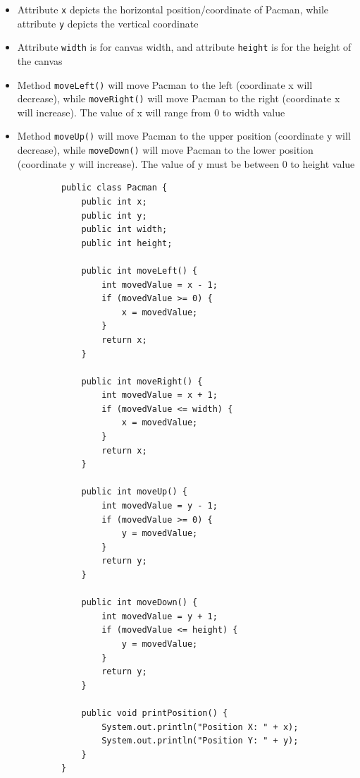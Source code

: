 \documentclass[12pt,titlepage]{article}
\begin{document}
\begin{enumerate}
{        \begin{itemize}
            \item Attribute \texttt{x} depicts the horizontal position/coordinate of Pacman, while attribute \texttt{y} depicts the vertical coordinate
            \item Attribute \texttt{width} is for canvas width, and attribute \texttt{height} is for the height of the canvas
            \item {
                Method \texttt{moveLeft()} will move Pacman to the left (coordinate x will decrease),
                while \texttt{moveRight()} will move Pacman to the right (coordinate x will increase).
                The value of x will range from 0 to width value
            }
            \item {
                Method \texttt{moveUp()} will move Pacman to the upper position (coordinate y will decrease),
                while \texttt{moveDown()} will move Pacman to the lower position (coordinate y will increase).
                The value of y must be between 0 to height value
            }
        \end{itemize}

        \newpage

        \begin{verbatim}
            public class Pacman {
                public int x;
                public int y;
                public int width;
                public int height;

                public int moveLeft() {
                    int movedValue = x - 1;
                    if (movedValue >= 0) {
                        x = movedValue;
                    }
                    return x; 
                }

                public int moveRight() {
                    int movedValue = x + 1;
                    if (movedValue <= width) {
                        x = movedValue;
                    }
                    return x;
                }

                public int moveUp() {
                    int movedValue = y - 1;
                    if (movedValue >= 0) {
                        y = movedValue;
                    }
                    return y; 
                }

                public int moveDown() {
                    int movedValue = y + 1;
                    if (movedValue <= height) {
                        y = movedValue;
                    }
                    return y;
                }

                public void printPosition() {
                    System.out.println("Position X: " + x);
                    System.out.println("Position Y: " + y);
                }
            }
        \end{verbatim}
    }
\end{enumerate}
\end{document}
